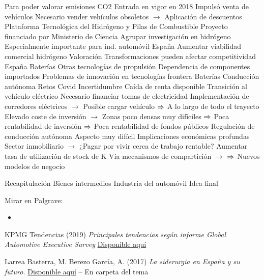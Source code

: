 \documentclass{nuevotema}
\begin{document}
\begin{esquemal}
				\4[] Para poder valorar emisiones CO2
				\4 Entrada en vigor en 2018
				\4[] Impulsó venta de vehículos
				\4[] Necesario vender vehículos obsoletos
				\4[] $\to$ Aplicación de descuentos
			\3 Plataforma Tecnológica del Hidrógeno y Pilas de Combustible
				\4 Proyecto financiado por Ministerio de Ciencia
				\4 Agrupar investigación en hidrógeno
				\4 Especialmente importante para ind. automóvil España
				\4 Aumentar viabilidad comercial hidrógeno
			\3 Valoración
				\4 Transformaciones pueden afectar competitividad España
				\4[] Baterías
				\4[] Otras tecnologías de propulsión
				\4 Dependencia de componentes importados
				\4 Problemas de innovación en tecnologías frontera
				\4[] Baterías
				\4[] Conducción autónoma
			\3 Retos
				\4 Covid
				\4[] Incertidumbre
				\4[] Caída de renta disponible
				\4 Transición al vehículo eléctrico
				\4[] Necesario financiar tomas de electricidad
				\4[] Implementación de corredores eléctricos
				\4[] $\to$ Posible cargar vehículo
				\4[] $\Rightarrow$ A lo largo de todo el trayecto
				\4[] Elevado coste de inversión
				\4[] $\to$ Zonas poco densas muy difíciles
				\4[] $\Rightarrow$ Poca rentabilidad de inversión
				\4[] $\Rightarrow$ Poca rentabilidad de fondos públicos
				\4 Regulación de conducción autónoma
				\4[] Aspecto muy difícil
				\4[] Implicaciones económicas profundas
				\4[] Sector inmobiliario
				\4[] $\to$ ¿Pagar por vivir cerca de trabajo rentable?
				\4 Aumentar tasa de utilización de stock de K
				\4[] Vía mecanismos de compartición
				\4[] $\to$
				\4[] $\Rightarrow$ Nuevos modelos de negocio
				
	\1[] 
		\2 Recapitulación
			\3 Bienes intermedios
			\3 Industria del automóvil
		\2 Idea final
\end{esquemal}

\graficas

\conceptos

\preguntas

\notas

\bibliografia

Mirar en Palgrave:
\begin{itemize}
	\item 
\end{itemize}

KPMG Tendencias (2019) \textit{Principales tendencias según informe Global Automotive Executive Survey} \href{https://www.tendencias.kpmg.es/2019/02/claves-automocion-2019/}{Disponible aquí}

Larrea Basterra, M. Berezo García, A. (2017) \textit{La siderurgia en España y su futuro.} \href{https://www.mincotur.gob.es/Publicaciones/Publicacionesperiodicas/EconomiaIndustrial/RevistaEconomiaIndustrial/406/LARREA%20Y%20GARCIA.pdf}{Disponible aquí} -- En carpeta del tema
\end{document}
